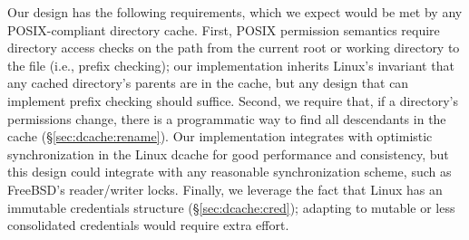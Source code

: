 Our design has the following requirements, which we expect would be met by any 
POSIX-compliant directory cache.
First, POSIX permission semantics require directory access checks on the path from
the current root or working directory to the file (i.e., prefix checking);
our implementation inherits Linux's invariant that any cached directory's parents are in the cache,
but any design that can implement prefix checking should suffice.
Second, we require that, if a directory's permissions change, there is a programmatic way to find all
descendants in the cache (\S\ref{sec:dcache:rename}).
Our implementation integrates with optimistic synchronization 
in the Linux dcache for good performance and consistency, but 
this design could integrate with any reasonable synchronization scheme, such as
FreeBSD's reader/writer locks.  
Finally, we leverage the fact that Linux has an immutable credentials structure (\S\ref{sec:dcache:cred});
adapting to mutable or less consolidated credentials would require extra effort.


